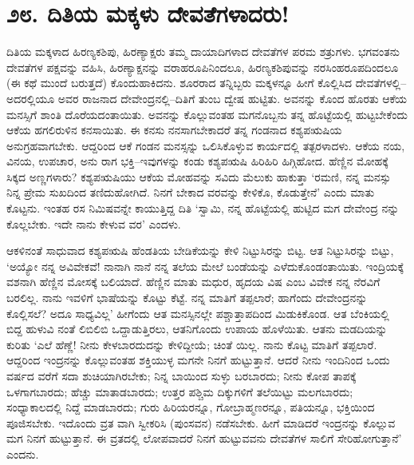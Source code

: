 
\chapter{೨೮. ದಿತಿಯ ಮಕ್ಕಳು ದೇವತೆಗಳಾದರು!}

ದಿತಿಯ ಮಕ್ಕಳಾದ ಹಿರಣ್ಯಕಶಿಪು, ಹಿರಣ್ಯಾಕ್ಷರು ತಮ್ಮ ದಾಯಾದಿಗಳಾದ ದೇವತೆಗಳ ಪರಮ ಶತ್ರುಗಳು. ಭಗವಂತನು ದೇವತೆಗಳ ಪಕ್ಷವನ್ನು ವಹಿಸಿ, ಹಿರಣ್ಯಾಕ್ಷನನ್ನು ವರಾಹರೂಪಿನಿಂದಲೂ, ಹಿರಣ್ಯಕಶಿಪುವನ್ನು ನರಸಿಂಹರೂಪದಿಂದಲೂ (ಈ ಕಥೆ ಮುಂದೆ ಬರುತ್ತದೆ) ಕೊಂದುಹಾಕಿದನು. ಶೂರರಾದ ತನ್ನಿಬ್ಬರು ಮಕ್ಕಳನ್ನೂ ಹೀಗೆ ಕೊಲ್ಲಿಸಿದ ದೇವತೆಗಳಲ್ಲಿ–ಅದರಲ್ಲಿಯೂ ಅವರ ರಾಜನಾದ ದೇವೇಂದ್ರನಲ್ಲಿ–ದಿತಿಗೆ ತುಂಬ ದ್ವೇಷ ಹುಟ್ಟಿತು. ಅವನನ್ನು ಕೊಂದ ಹೊರತು ಆಕೆಯ ಮನಸ್ಸಿಗೆ ಶಾಂತಿ ದೊರೆಯದಂತಾಯಿತು. ಅವನನ್ನು ಕೊಲ್ಲುವಂತಹ ಮಗನೊಬ್ಬನು ತನ್ನ ಹೊಟ್ಟೆಯಲ್ಲಿ ಹುಟ್ಟಬೇಕೆಂದು ಆಕೆಯ ಹಗಲಿರುಳಿನ ಕನಸಾಯಿತು. ಈ ಕನಸು ನನಸಾಗಬೇಕಾದರೆ ತನ್ನ ಗಂಡನಾದ ಕಶ್ಯಪಋಷಿಯ ಅನುಗ್ರಹವಾಗಬೇಕು. ಆದ್ದರಿಂದ ಆಕೆ ಗಂಡನ ಮನಸ್ಸನ್ನು ಒಲಿಸಿಕೊಳ್ಳುವ ಕಾರ್ಯದಲ್ಲಿ ತತ್ಪರಳಾದಳು. ಆಕೆಯ ನಯ, ವಿನಯ, ಉಪಚಾರ, ಅನು ರಾಗ ಭಕ್ತಿ–ಇವುಗಳನ್ನು ಕಂಡು ಕಶ್ಯಪಋಷಿ ಹಿರಿಹಿರಿ ಹಿಗ್ಗಿಹೋದ. ಹೆಣ್ಣಿನ ಮೋಹಕ್ಕೆ ಸಿಕ್ಕದ ಅಣ್ಣಗಳಾರು? ಕಶ್ಯಪಋಷಿಯು ಆಕೆಯ ಮೋಹವನ್ನು ಸವಿದು ಮೆಲುಕು ಹಾಕುತ್ತಾ ‘ರಮಣಿ, ನನ್ನ ಮನಸ್ಸು ನಿನ್ನ ಪ್ರೇಮ ಸುಖದಿಂದ ತಣಿದುಹೋಗಿದೆ. ನಿನಗೆ ಬೇಕಾದ ವರವನ್ನು ಕೇಳಿಕೊ, ಕೊಡುತ್ತೇನೆ’ ಎಂದು ಮಾತು ಕೊಟ್ಟನು. ಇಂತಹ ರಸ ನಿಮಿಷವನ್ನೇ ಕಾಯುತ್ತಿದ್ದ ದಿತಿ ‘ಸ್ವಾಮಿ, ನನ್ನ ಹೊಟ್ಟೆಯಲ್ಲಿ ಹುಟ್ಟಿದ ಮಗ ದೇವೇಂದ್ರ ನನ್ನು ಕೊಲ್ಲಬೇಕು. ಇದೇ ನಾನು ಕೇಳುವ ವರ’ ಎಂದಳು.

ಆಕಳಿನಂತೆ ಸಾಧುವಾದ ಕಶ್ಯಪಋಷಿ ಹೆಂಡತಿಯ ಬೇಡಿಕೆಯನ್ನು ಕೇಳಿ ನಿಟ್ಟುಸಿರನ್ನು ಬಿಟ್ಟ. ಆತ ನಿಟ್ಟುಸಿರನ್ನು ಬಿಟ್ಟು, ‘ಅಯ್ಯೋ ನನ್ನ ಅವಿವೇಕವೆ! ನಾನಾಗಿ ನಾನೆ ನನ್ನ ತಲೆಯ ಮೇಲೆ ಬಂಡೆಯನ್ನು ಎಳೆದುಕೊಂಡಂತಾಯಿತು. ಇಂದ್ರಿಯಕ್ಕೆ ವಶನಾಗಿ ಹೆಣ್ಣಿನ ಮೋಸಕ್ಕೆ ಬಲಿಯಾದೆ. ಹೆಣ್ಣಿನ ಮಾತು ಮಧುರ, ಹೃದಯ ವಿಷ ಎಂಬ ವಿವೇಕ ನನ್ನ ನೆರವಿಗೆ ಬರಲಿಲ್ಲ. ನಾನು ಇವಳಿಗೆ ಭಾಷೆಯನ್ನು ಕೊಟ್ಟು ಕೆಟ್ಟೆ. ನನ್ನ ಮಾತಿಗೆ ತಪ್ಪಲಾರೆ; ಹಾಗೆಂದು ದೇವೇಂದ್ರನನ್ನು ಕೊಲ್ಲಿಸಲೆ? ಅದೂ ಸಾಧ್ಯವಿಲ್ಲ’ ಹೀಗೆಂದು ಆತ ಮನಸ್ಸಿನಲ್ಲೇ ಪಶ್ಚಾತ್ತಾಪದಿಂದ ಮಿಡುಕಿಕೊಂಡ. ಆತ ಬೆಂಕಿಯಲ್ಲಿ ಬಿದ್ದ ಹುಳುವಿ ನಂತೆ ಲಿಬಿಲಿಬಿ ಒದ್ದಾಡುತ್ತಿರಲು, ಆತನಿಗೊಂದು ಉಪಾಯ ಹೊಳೆಯಿತು. ಆತನು ಮಡದಿಯನ್ನು ಕುರಿತು ‘ಎಲೆ ಹೆಣ್ಣೆ! ನೀನು ಕೇಳಬಾರದುದನ್ನು ಕೇಳಿದ್ದೀಯೆ; ಚಿಂತೆ ಯಿಲ್ಲ. ನಾನು ಕೊಟ್ಟ ಮಾತಿಗೆ ತಪ್ಪಲಾರೆ. ಆದ್ದರಿಂದ ಇಂದ್ರನನ್ನು ಕೊಲ್ಲುವಂತಹ ಶಕ್ತಿಯುಳ್ಳ ಮಗನೇ ನಿನಗೆ ಹುಟ್ಟುತ್ತಾನೆ. ಆದರೆ ನೀನು ಇಂದಿನಿಂದ ಒಂದು ವರ್ಷದ ವರೆಗೆ ಸದಾ ಶುಚಿಯಾಗಿರಬೇಕು; ನಿನ್ನ ಬಾಯಿಂದ ಸುಳ್ಳು ಬರಬಾರದು; ನೀನು ಕೋಪ ತಾಪಕ್ಕೆ ಒಳಗಾಗಬಾರದು; ಹೆಚ್ಚು ಮಾತಾಡಬಾರದು; ಉತ್ತರ ಪಶ್ಚಿಮ ದಿಕ್ಕುಗಳಿಗೆ ತಲೆಯಿಟ್ಟು ಮಲಗಬಾರದು; ಸಂಧ್ಯಾಕಾಲದಲ್ಲಿ ನಿದ್ದೆ ಮಾಡಬಾರದು; ಗುರು ಹಿರಿಯರನ್ನೂ, ಗೋಬ್ರಾಹ್ಮಣರನ್ನೂ, ಪತಿಯನ್ನೂ, ಭಕ್ತಿಯಿಂದ ಪೂಜಿಸಬೇಕು. ಇದೊಂದು ವ್ರತ ವಾಗಿ ಸ್ವೀಕರಿಸಿ (ಪುಂಸವನ) ನಡೆಸಬೇಕು. ಹೀಗೆ ಮಾಡಿದರೆ ಇಂದ್ರನನ್ನು ಕೊಲ್ಲುವ ಮಗ ನಿನಗೆ ಹುಟ್ಟುತ್ತಾನೆ. ಈ ವ್ರತದಲ್ಲಿ ಲೋಪವಾದರೆ ನಿನಗೆ ಹುಟ್ಟುವವನು ದೇವತೆಗಳ ಸಾಲಿಗೆ ಸೇರಿಹೋಗುತ್ತಾನೆ’ ಎಂದನು.

